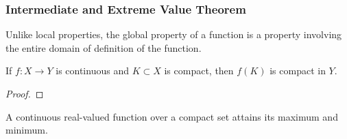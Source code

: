   \subsubsection{Intermediate and Extreme Value Theorem}

    Unlike local properties, the global property of a function is a property involving the entire domain of definition of the function. 

    \begin{theorem}
      If $f: X \rightarrow Y$ is continuous and $K \subset X$ is compact, then $f(K)$ is compact in $Y$. 
    \end{theorem}
    \begin{proof}
      
    \end{proof}

    \begin{corollary}
      A continuous real-valued function over a compact set attains its maximum and minimum. 
    \end{corollary}

